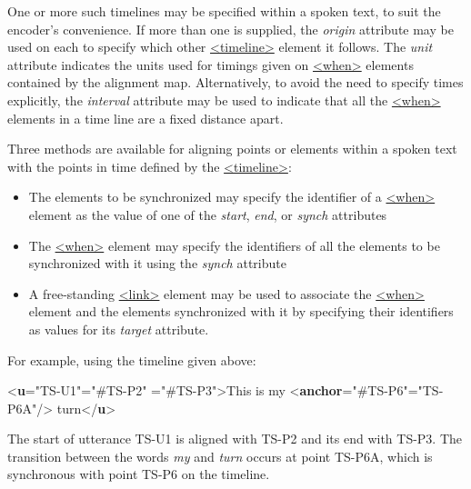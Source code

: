 One or more such timelines may be specified within a spoken text, to suit the encoder's convenience. If more than one is supplied, the {\itshape origin} attribute may be used on each to specify which other \hyperref[TEI.timeline]{<timeline>} element it follows. The {\itshape unit} attribute indicates the units used for timings given on \hyperref[TEI.when]{<when>} elements contained by the alignment map. Alternatively, to avoid the need to specify times explicitly, the {\itshape interval} attribute may be used to indicate that all the \hyperref[TEI.when]{<when>} elements in a time line are a fixed distance apart.\par
Three methods are available for aligning points or elements within a spoken text with the points in time defined by the \hyperref[TEI.timeline]{<timeline>}: \begin{itemize}
\item The elements to be synchronized may specify the identifier of a \hyperref[TEI.when]{<when>} element as the value of one of the {\itshape start}, {\itshape end}, or {\itshape synch} attributes
\item The \hyperref[TEI.when]{<when>} element may specify the identifiers of all the elements to be synchronized with it using the {\itshape synch} attribute
\item A free-standing \hyperref[TEI.link]{<link>} element may be used to associate the \hyperref[TEI.when]{<when>} element and the elements synchronized with it by specifying their identifiers as values for its {\itshape target} attribute.
\end{itemize} \par
For example, using the timeline given above: \par\bgroup{}\exampleFont \begin{shaded}\noindent\mbox{}{<\textbf{u}\hspace*{1em}{xml:id}="{TS-U1}"\hspace*{1em}{start}="{\#TS-P2}"\mbox{}\newline 
\hspace*{1em}{end}="{\#TS-P3}">}This is my {<\textbf{anchor}\hspace*{1em}{synch}="{\#TS-P6}"\hspace*{1em}{xml:id}="{TS-P6A}"/>} turn{</\textbf{u}>}\end{shaded}\egroup\par \noindent  The start of utterance TS-U1 is aligned with TS-P2 and its end with TS-P3. The transition between the words \textit{my} and \textit{turn} occurs at point TS-P6A, which is synchronous with point TS-P6 on the timeline.\par
